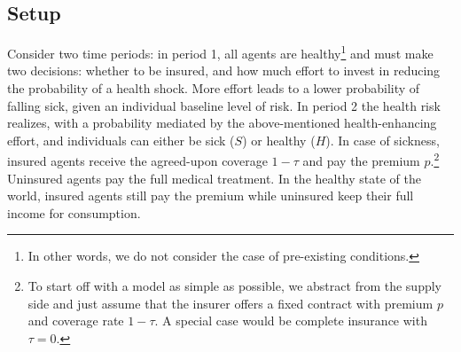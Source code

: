 \subsection{Setup}

Consider two time periods: in period 1, all agents are healthy\footnote{In other words, we do not consider the case of pre-existing conditions.} and must make two decisions: whether to be insured, and how much effort to invest in reducing the probability of a health shock.
More effort leads to a lower probability of falling sick, given an individual baseline level of risk.
In period 2 the health risk realizes, with a probability mediated by the above-mentioned health-enhancing effort, and individuals can either be sick ($S$) or healthy ($H$).
In case of sickness, insured agents receive the agreed-upon coverage $1-\tau$ and pay the premium $p$.\footnote{To start off with a model as simple as possible, we abstract from the supply side and just assume that the insurer offers a fixed contract with premium $p$ and coverage rate $1-\tau$. A special case would be complete insurance with $\tau=0$.}
Uninsured agents pay the full medical treatment.
In the healthy state of the world, insured agents still pay the premium while uninsured keep their full income for consumption.

